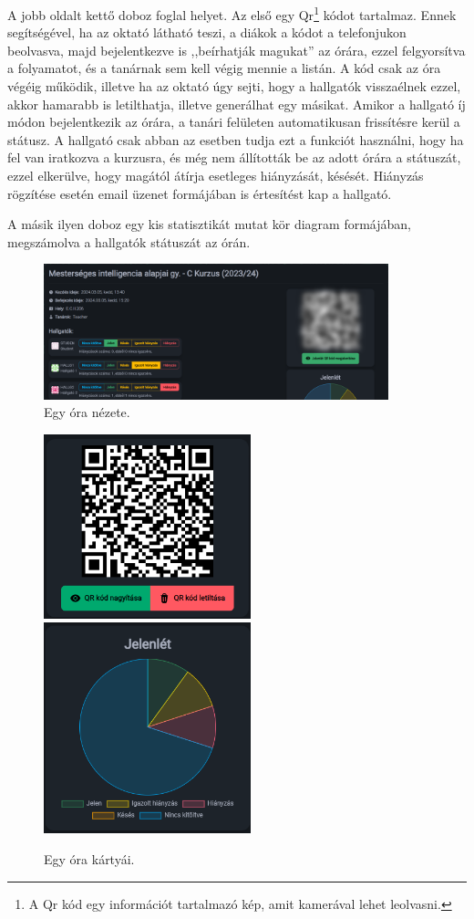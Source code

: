 \documentclass[
]{thesis-ekf}
\theoremstyle{definition}
\theoremstyle{remark}
\begin{document}
A jobb oldalt kettő doboz foglal helyet. Az első egy Qr\footnote{A Qr kód egy információt tartalmazó kép,  amit kamerával lehet leolvasni.\cite{QR}} kódot tartalmaz. Ennek segítségével, ha az oktató látható teszi, a diákok a kódot a telefonjukon beolvasva, majd bejelentkezve is ,,beírhatják magukat'' az órára, ezzel felgyorsítva a folyamatot, és a tanárnak sem kell végig mennie a listán. A kód csak az óra végéig működik, illetve ha az oktató úgy sejti, hogy a hallgatók visszaélnek ezzel, akkor hamarabb is letilthatja, illetve generálhat egy másikat. Amikor a hallgató íj módon bejelentkezik az órára, a tanári felületen automatikusan frissítésre kerül a státusz. A hallgató csak abban az esetben tudja ezt a funkciót használni, hogy ha fel van iratkozva a kurzusra, és még nem állították be az adott órára a státuszát, ezzel elkerülve, hogy magától átírja esetleges hiányzását, késését. Hiányzás rögzítése esetén email üzenet formájában is értesítést kap a hallgató.

A másik ilyen doboz egy kis statisztikát mutat kör diagram formájában, megszámolva a hallgatók státuszát az órán.

\begin{figure}[ht!]
	\centering
	\includegraphics[width=10cm]{../pictures/screenshots/class_1.png}
	\caption{Egy óra nézete.}
	\label{class}
\end{figure}

\begin{figure}[ht!]
	\centering
	\includegraphics[width=6cm]{../pictures/screenshots/class_2.png}
	\includegraphics[width=6cm]{../pictures/screenshots/class_3.png}
	\caption{Egy óra kártyái.}
	\label{class2}
\end{figure}
\end{document}
